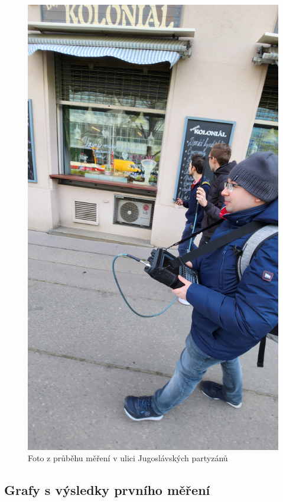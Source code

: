 \begin{figure}[h!]
    \centering
    \includegraphics[angle=270,scale=0.07]{img/foto_mereni_jugoslavskych_partyzanu.jpg}
    \caption{Foto z průběhu měření v ulici Jugoslávských partyzánů}
    \label{fig:my_label}
\end{figure}

\subsection{Grafy s výsledky prvního měření}

